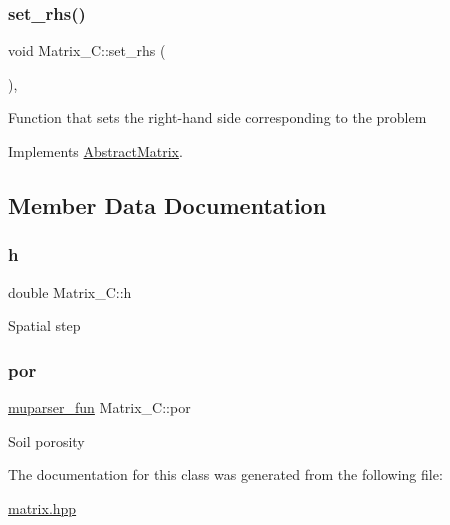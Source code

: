 \subsubsection{\texorpdfstring{set\+\_\+rhs()}{set\_rhs()}}
{\footnotesize\ttfamily void Matrix\+\_\+\+C\+::set\+\_\+rhs (\begin{DoxyParamCaption}{ }\end{DoxyParamCaption})\hspace{0.3cm}{\ttfamily [override]}, {\ttfamily [virtual]}}

Function that sets the right-\/hand side corresponding to the problem 

Implements \hyperlink{classAbstractMatrix_a1334661de25f76dc65f16538c167a03c}{Abstract\+Matrix}.



\subsection{Member Data Documentation}
\mbox{\label{classMatrix__C_ac381c022ef4080ac749c69d92a9f5927}} 
\subsubsection{\texorpdfstring{h}{h}}
{\footnotesize\ttfamily double Matrix\+\_\+\+C\+::h\hspace{0.3cm}{\ttfamily [private]}}

Spatial step \mbox{\label{classMatrix__C_a45440dbea003cf386406ad510e32bc25}} 
\subsubsection{\texorpdfstring{por}{por}}
{\footnotesize\ttfamily \hyperlink{classmuparser__fun}{muparser\+\_\+fun} Matrix\+\_\+\+C\+::por\hspace{0.3cm}{\ttfamily [private]}}

Soil porosity 

The documentation for this class was generated from the following file\+:\begin{DoxyCompactItemize}
\item 
\hyperlink{matrix_8hpp}{matrix.\+hpp}\end{DoxyCompactItemize}
